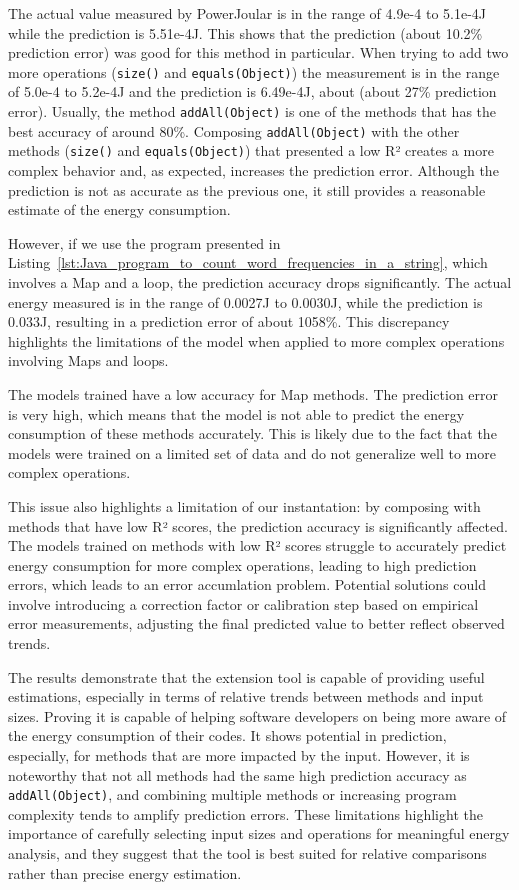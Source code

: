 The actual value measured by PowerJoular is in the range of 4.9e-4 to 5.1e-4J while the prediction is 5.51e-4J. This shows that the prediction (about 10.2\% prediction error) was good for this method in particular.
When trying to add two more operations (\texttt{size()} and \texttt{equals(Object)}) the measurement is in the range of 5.0e-4 to 5.2e-4J and the prediction is 6.49e-4J, about (about 27\% prediction error). Usually, the method \texttt{addAll(Object)} is one of the methods that has the best accuracy of around 80\%. Composing \texttt{addAll(Object)} with the other methods (\texttt{size()} and \texttt{equals(Object)}) that presented a low R² creates a more complex behavior and, as expected, increases the prediction error. Although the prediction is not as accurate as the previous one, it still provides a reasonable estimate of the energy consumption.

However, if we use the program presented in Listing~\ref{lst:Java_program_to_count_word_frequencies_in_a_string}, which involves a Map and a loop, the prediction accuracy drops significantly. The actual energy measured is in the range of 0.0027J to 0.0030J, while the prediction is 0.033J, resulting in a prediction error of about 1058\%. This discrepancy highlights the limitations of the model when applied to more complex operations involving Maps and loops.

The models trained have a low accuracy for Map methods. The prediction error is very high, which means that the model is not able to predict the energy consumption of these methods accurately. This is likely due to the fact that the models were trained on a limited set of data and do not generalize well to more complex operations.

This issue also highlights a limitation of our instantation: by composing with methods that have low R² scores, the prediction accuracy is significantly affected. The models trained on methods with low R² scores struggle to accurately predict energy consumption for more complex operations, leading to high prediction errors, which leads to an error accumlation problem. Potential solutions could involve introducing a correction factor or calibration step based on empirical error measurements, adjusting the final predicted value to better reflect observed trends.

The results demonstrate that the extension tool is capable of providing useful estimations, especially in terms of relative trends between methods and input sizes. Proving it is capable of helping software developers on being more aware of the energy consumption of their codes. It shows potential in prediction, especially, for methods that are more impacted by the input. However, it is noteworthy that not all methods had the same high prediction accuracy as \texttt{addAll(Object)}, and combining multiple methods or increasing program complexity tends to amplify prediction errors.
These limitations highlight the importance of carefully selecting input sizes and operations for meaningful energy analysis, and they suggest that the tool is best suited for relative comparisons rather than precise energy estimation.

